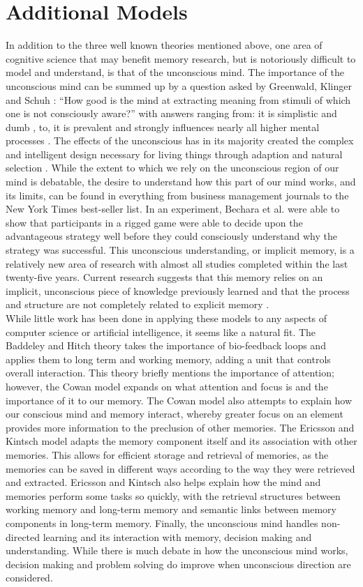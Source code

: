 \section{Additional Models}
In addition to the three well known theories mentioned above, one area of cognitive science that may benefit memory research, but is notoriously difficult to model and understand, is that of the unconscious mind. The importance of the unconscious mind can be summed up by a question asked by Greenwald, Klinger and Schuh \cite{SUBQUESTION}: ``How good is the mind at extracting meaning from stimuli of which one is not consciously aware?'' with answers ranging from: it is simplistic and dumb \cite{DUMBUNCONSCIOUS}, to, it is prevalent and strongly influences nearly all higher mental processes \cite{SMARTUNCONSCIOUS}. The effects of the unconscious has in its majority created the complex and intelligent design necessary for living things through adaption and natural selection \cite{UnconsciousMind}.  While the extent to which we rely on the unconscious region of our mind is debatable, the desire to understand how this part of our mind works, and its limits, can be found in everything from business management journals to the New York Times best-seller list. In an experiment, Bechara et al.\cite{Bechara2} were able to show that participants in a rigged game were able to decide upon the advantageous strategy well before they could consciously understand why the strategy was successful. This unconscious understanding, or implicit memory, is a relatively new area of research with almost all studies completed within the last twenty-five years. Current research suggests that this memory relies on an implicit, unconscious piece of knowledge previously learned and that the process and structure are not completely related to explicit memory \cite{ImplicitMem}.
\\
While little work has been done in applying these models to any aspects of computer science or artificial intelligence, it seems like a natural fit.  The Baddeley and Hitch theory takes the importance of bio-feedback loops and applies them to long term and working memory, adding a unit that controls overall interaction.  This theory briefly mentions the importance of attention; however, the Cowan model expands on what attention and focus is and the importance of it to our memory.  The Cowan model also attempts to explain how our conscious mind and memory interact, whereby greater focus on an element provides more information to the preclusion of other memories. The Ericsson and Kintsch model adapts the memory component itself and its association with other memories. This allows for efficient storage and retrieval of memories, as the memories can be saved in different ways according to the way they were retrieved and extracted.  Ericsson and Kintsch also helps explain how the mind and memories perform some tasks so quickly, with the retrieval structures between working memory and long-term memory and semantic links between memory components in long-term memory. Finally, the unconscious mind handles non-directed learning and its interaction with memory, decision making and understanding. While there is much debate in how the unconscious mind works, decision making and problem solving do improve when unconscious direction are considered.
